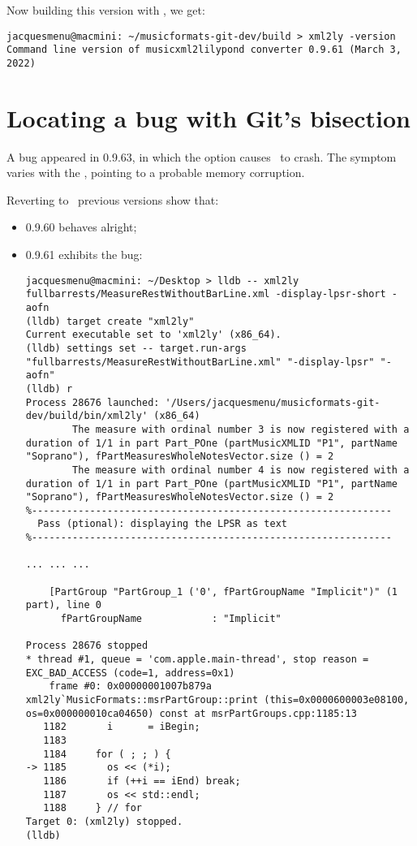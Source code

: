 Now building this version with , we get:
\begin{lstlisting}[language=Terminal]
jacquesmenu@macmini: ~/musicformats-git-dev/build > xml2ly -version
Command line version of musicxml2lilypond converter 0.9.61 (March 3, 2022)
\end{lstlisting}


\chapter{Locating a bug with Git's bisection}

A bug appeared in 0.9.63, in which the  option causes \xmlToLy\ to crash.
The symptom varies with the \OS, pointing to a probable memory corruption.

Reverting to \mf\ previous versions show that:
\begin{itemize}
\item 0.9.60 behaves alright;
\item 0.9.61 exhibits the bug:

\begin{lstlisting}[language=Terminal]
jacquesmenu@macmini: ~/Desktop > lldb -- xml2ly  fullbarrests/MeasureRestWithoutBarLine.xml -display-lpsr-short -aofn
(lldb) target create "xml2ly"
Current executable set to 'xml2ly' (x86_64).
(lldb) settings set -- target.run-args  "fullbarrests/MeasureRestWithoutBarLine.xml" "-display-lpsr" "-aofn"
(lldb) r
Process 28676 launched: '/Users/jacquesmenu/musicformats-git-dev/build/bin/xml2ly' (x86_64)
        The measure with ordinal number 3 is now registered with a duration of 1/1 in part Part_POne (partMusicXMLID "P1", partName "Soprano"), fPartMeasuresWholeNotesVector.size () = 2
        The measure with ordinal number 4 is now registered with a duration of 1/1 in part Part_POne (partMusicXMLID "P1", partName "Soprano"), fPartMeasuresWholeNotesVector.size () = 2
%--------------------------------------------------------------
  Pass (ptional): displaying the LPSR as text
%--------------------------------------------------------------

... ... ...

    [PartGroup "PartGroup_1 ('0', fPartGroupName "Implicit")" (1 part), line 0
      fPartGroupName            : "Implicit"

Process 28676 stopped
* thread #1, queue = 'com.apple.main-thread', stop reason = EXC_BAD_ACCESS (code=1, address=0x1)
    frame #0: 0x00000001007b879a xml2ly`MusicFormats::msrPartGroup::print (this=0x0000600003e08100, os=0x000000010ca04650) const at msrPartGroups.cpp:1185:13
   1182	      i      = iBegin;
   1183
   1184	    for ( ; ; ) {
-> 1185	      os << (*i);
   1186	      if (++i == iEnd) break;
   1187	      os << std::endl;
   1188	    } // for
Target 0: (xml2ly) stopped.
(lldb)
\end{lstlisting}

\end{itemize}

